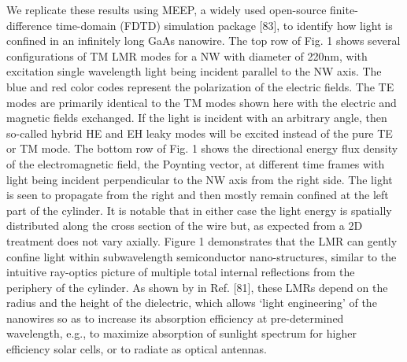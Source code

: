 We replicate these results using MEEP, a widely used open-source finite-difference time-domain (FDTD) simulation package [83], to identify how light is confined in an infinitely long GaAs nanowire. The top row of Fig. 1 shows several configurations of TM LMR modes for a NW with diameter of 220nm, with excitation single wavelength light being incident parallel to the NW axis. The blue and red color codes represent the polarization of the electric fields. The TE modes are primarily identical to the TM modes shown here with the electric and magnetic fields exchanged. If the light is incident with an arbitrary angle, then so-called hybrid HE and EH leaky modes will be excited instead of the pure TE or TM mode.  The bottom row of Fig. 1 shows the directional energy flux density of the electromagnetic field, the Poynting vector, at different time frames with light being incident perpendicular to the NW axis from the right side. The light is seen to propagate from the right and then mostly remain confined at the left part of the cylinder. It is notable that in either case the light energy is spatially distributed along the cross section of the wire but, as expected from a 2D treatment does not vary axially. Figure 1 demonstrates that the LMR can gently confine light within subwavelength semiconductor nano-structures, similar to the intuitive ray-optics picture of multiple total internal reflections from the periphery of the cylinder. As shown by in Ref. [81], these LMRs depend on the radius and the height of the dielectric, which allows ‘light engineering’ of the nanowires so as to increase its absorption efficiency at pre-determined wavelength, e.g., to maximize absorption of sunlight spectrum for  higher efficiency solar cells, or to radiate as optical antennas. 

